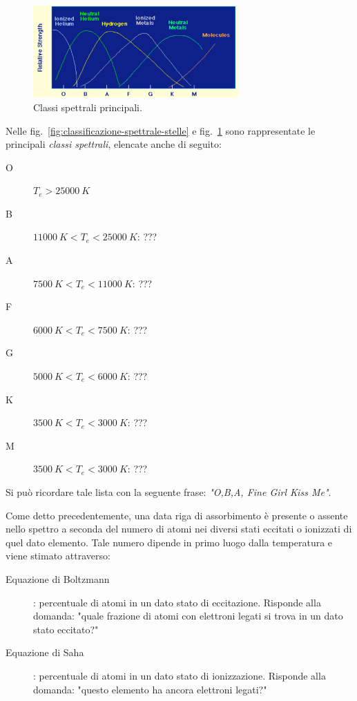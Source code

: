 \begin{figure}
    \centering
    \includegraphics[width=0.7\textwidth]{immagini/classificazione-spettrale-stelle-2.png}
    \caption{Classi spettrali principali.}
    \label{fig:classificazione-spettrale-stelle-2}
    
\end{figure}

Nelle fig.~\ref{fig:classificazione-spettrale-stelle} e fig.~\ref{fig:classificazione-spettrale-stelle-2} sono rappresentate le principali \emph{classi spettrali}, elencate anche di seguito:
\begin{description}
    \item[O] $T_e > \SI{25000}{K}$
    \item[B] $ \SI{11000}{K} < T_e < \SI{25000}{K}$: ???
    \item[A] $ \SI{7500}{K} < T_e < \SI{11000}{K} $: ???
    \item[F] $ \SI{6000}{K} < T_e < \SI{7500}{K} $: ???
    \item[G] $ \SI{5000}{K} < T_e < \SI{6000}{K} $: ???
    \item[K] $ \SI{3500}{K} < T_e < \SI{3000}{K} $: ???
    \item[M] $ \SI{3500}{K} < T_e < \SI{3000}{K} $: ???
\end{description}
Si può ricordare tale lista con la seguente frase: \emph{"O,B,A, Fine Girl Kiss Me"}.

Come detto precedentemente, una data riga di assorbimento è presente o assente nello spettro a seconda del numero di atomi nei diversi stati eccitati o ionizzati di quel dato elemento. Tale numero dipende in primo luogo dalla temperatura e viene stimato attraverso:
\begin{description}
    \item[Equazione di Boltzmann]: percentuale di atomi in un dato stato di eccitazione. Risponde alla domanda: "quale frazione di atomi con elettroni legati si trova in un dato stato eccitato?"
    \item[Equazione di Saha]: percentuale di atomi in un dato stato di ionizzazione. Risponde alla domanda: "questo elemento ha ancora elettroni legati?"
\end{description}

